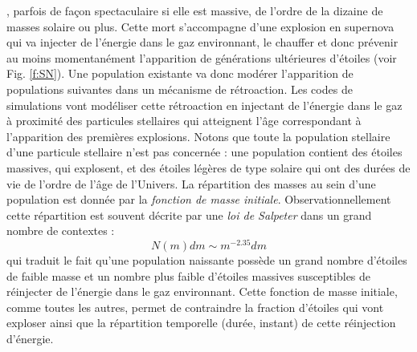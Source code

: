 , parfois de façon spectaculaire si elle est massive, de l'ordre de la dizaine de masses solaire ou plus. Cette mort s'accompagne d'une explosion en supernova qui va injecter de l'énergie dans le gaz environnant, le chauffer et donc prévenir au moins momentanément l'apparition de générations ultérieures d'étoiles (voir Fig. \ref{f:SN}). Une population existante va donc modérer l'apparition de populations suivantes dans un mécanisme de rétroaction. Les codes de simulations vont modéliser cette rétroaction en injectant de l'énergie dans le gaz à proximité des particules stellaires qui atteignent l'âge correspondant à l'apparition des premières explosions. Notons que toute la population stellaire d'une particule stellaire n'est pas concernée : une population contient des étoiles massives, qui explosent, et des étoiles légères de type solaire qui ont des durées de vie de l'ordre de l'âge de l'Univers. La répartition des masses au sein d'une population est donnée par la \textit{fonction de masse initiale}. Observationnellement cette répartition est souvent décrite par une \textit{loi de Salpeter} dans un grand nombre de contextes :
\begin{equation}
N(m)dm\sim m^{-2.35}dm
\end{equation}
qui traduit le fait qu'une population naissante possède un grand nombre d'étoiles de faible masse et un nombre plus faible d'étoiles massives susceptibles de réinjecter de l'énergie dans le gaz environnant. Cette fonction de masse initiale, comme toutes les autres, permet de contraindre la fraction d'étoiles qui vont exploser ainsi que la répartition temporelle (durée, instant) de cette réinjection d'énergie.

